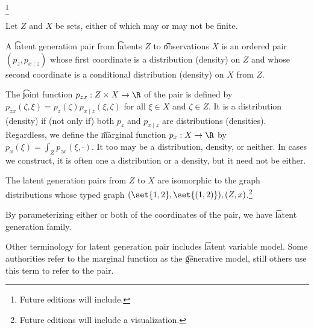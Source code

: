 
\footnote{Future editions will include.}


Let $Z$ and $X$ be sets, either of which may or may not be finite.

A \t{latent generation pair} from \t{latents} $Z$ to \t{observations} $X$ is an ordered pair $(p_z, p_{x \mid z})$ whose first coordinate is a distribution (density) on $Z$ and whose second coordinate is a conditional distribution (density) on $X$ from $Z$.

The \t{joint function} $p_{zx}: Z \times X \to \R$ of the pair is defined by $p_{zx}(\zeta, \xi) = p_{z}(\zeta)p_{x \mid z}(\xi, \zeta)$ for all $\xi \in X$ and $\zeta \in Z$.
It is a distribution (density) if (not only if)  both $p_{z}$ and $p_{x \mid z}$ are distributions (densities).
Regardless, we define the \t{marginal function} $p_x: X \to \R$ by $p_x(\xi) = \int_Z p_{zx}(\xi, \cdot)$.
It too may be a distribution, density, or neither.
In cases we construct, it is often one a distribution or a density, but it need not be either.


The latent generation pairs from $Z$ to $X$ are isomorphic to the graph distributions whose typed graph $(\set{1, 2}, \set{(1,2)}), (Z, x)$.\footnote{Future editions will include a visualization.}


By parameterizing either or both of the coordinates of the pair, we have \t{latent generation family}.


Other terminology for latent generation pair includes \t{latent variable model}.
Some authorities refer to the marginal function as the \t{generative model}, still others use this term to refer to the pair.



